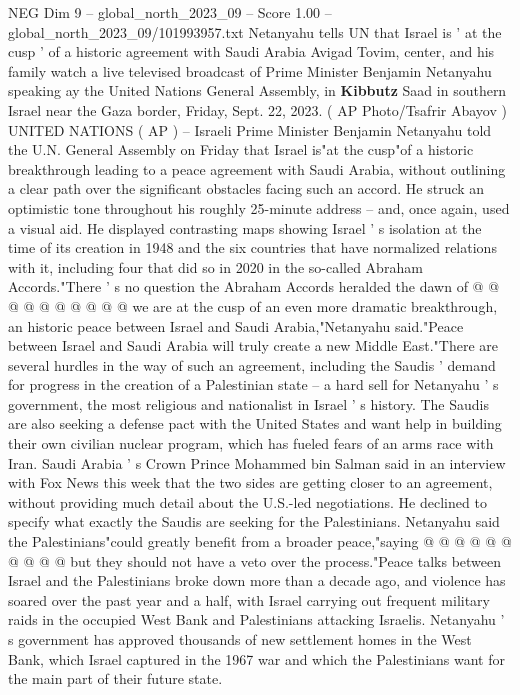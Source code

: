 \begin{textsample}{NEG Dim 9 – global\_north\_2023\_09 – Score 1.00 – global\_north\_2023\_09/101993957.txt}  \label{ex:f9_neg_438}
Netanyahu tells UN that Israel is ' at the cusp ' of a historic agreement with Saudi Arabia Avigad Tovim, center, and his family watch a live televised broadcast of Prime Minister Benjamin Netanyahu speaking ay the United Nations General Assembly, in \textbf{Kibbutz} Saad in southern Israel near the Gaza border, Friday, Sept. 22, 2023. ( AP Photo/Tsafrir Abayov ) UNITED NATIONS ( AP ) -- Israeli Prime Minister Benjamin Netanyahu told the U.N.
General Assembly on Friday that Israel is"at the cusp"of a historic breakthrough leading to a peace agreement with Saudi Arabia, without outlining a clear path over the significant obstacles facing such an accord.
He struck an optimistic tone throughout his roughly 25-minute address -- and, once again, used a visual aid.
He displayed contrasting maps showing Israel ' s isolation at the time of its creation in 1948 and the six countries that have normalized relations with it, including four that did so in 2020 in the so-called Abraham Accords."There ' s no question the Abraham Accords heralded the dawn of @ @ @ @ @ @ @ @ @ @ we are at the cusp of an even more dramatic breakthrough, an historic peace between Israel and Saudi Arabia,"Netanyahu said."Peace between Israel and Saudi Arabia will truly create a new Middle East."There are several hurdles in the way of such an agreement, including the Saudis ' demand for progress in the creation of a Palestinian state -- a hard sell for Netanyahu ' s government, the most religious and nationalist in Israel ' s history.
The Saudis are also seeking a defense pact with the United States and want help in building their own civilian nuclear program, which has fueled fears of an arms race with Iran.
Saudi Arabia ' s Crown Prince Mohammed bin Salman said in an interview with Fox News this week that the two sides are getting closer to an agreement, without providing much detail about the U.S.-led negotiations.
He declined to specify what exactly the Saudis are seeking for the Palestinians.
Netanyahu said the Palestinians"could greatly benefit from a broader peace,"saying @ @ @ @ @ @ @ @ @ @ but they should not have a veto over the process."Peace talks between Israel and the Palestinians broke down more than a decade ago, and violence has soared over the past year and a half, with Israel carrying out frequent military raids in the occupied West Bank and Palestinians attacking Israelis.
Netanyahu ' s government has approved thousands of new settlement homes in the West Bank, which Israel captured in the 1967 war and which the Palestinians want for the main part of their future state.

\end{textsample}
